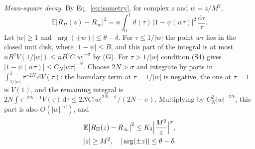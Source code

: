 \documentclass[aps,prd,10pt,twocolumn,superscriptaddress,nofootinbib,floatfix,longbibliography]{revtex4-2}
\newcommand{\bE}{\mathbb{E}}
\newcommand{\dd}{\mathrm{d}}
\begin{document}
\textit{Mean-square decay.} By Eq.~\eqref{eq:isometry}, for complex $z$ and $w=z/M^2$,
\begin{equation}
\label{eq:msq}
\bE\bigl|R_\Pi(z)-R_\infty\bigr|^2=n\int_0^1\vartheta(\tau)\,\bigl|1-\psi(w\tau)\bigr|^2\,\frac{\dd\tau}\tau .
\end{equation}
Let $|w|\ge1$ and $|\arg(\pm w)|\le\theta-\delta$. For $\tau\le1/|w|$ the point $w\tau$ lies in the closed unit disk, where $|1-\psi|\le B$, and this part of the integral is at most $nB^2V(1/|w|)\le nB^2C|w|^{-\sigma}$ by (G). For $\tau>1/|w|$ condition (S4) gives $|1-\psi(w\tau)|\le C_N|w\tau|^{-N}$. Choose $2N>\sigma$ and integrate by parts in $\int_{1/|w|}^1\tau^{-2N}\,\dd V(\tau)$: the boundary term at $\tau=1/|w|$ is negative, the one at $\tau=1$ is $V(1)$, and the remaining integral is $2N\int\tau^{-2N-1}V(\tau)\,\dd\tau\le2NC|w|^{2N-\sigma}/(2N-\sigma)$. Multiplying by $C_N^2|w|^{-2N}$, this part is also $O(|w|^{-\sigma})$, and
\begin{equation}
\label{eq:msdecay}
\begin{gathered}
\bE\bigl|R_\Pi(z)-R_\infty\bigr|^2\le K_\delta\Bigl|\frac{M^2}z\Bigr|^{\sigma},\\
|z|\ge M^2,\quad|\arg(\pm z)|\le\theta-\delta .
\end{gathered}
\end{equation}
\end{document}
